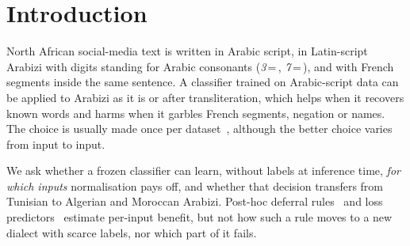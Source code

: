 \section{Introduction}
\label{sec:intro}

North African social-media text is written in Arabic script, in Latin-script Arabizi with digits standing for Arabic consonants (\textit{3}\,=\,, \textit{7}\,=\,), and with French segments inside the same sentence. A classifier trained on Arabic-script data can be applied to Arabizi as it is or after transliteration, which helps when it recovers known words and harms when it garbles French segments, negation or names. The choice is usually made once per dataset~\cite{muller2021unseen,moosa2023transliteration,artetxe2023revisiting}, although the better choice varies from input to input.

We ask whether a frozen classifier can learn, without labels at inference time, \emph{for which inputs} normalisation pays off, and whether that decision transfers from Tunisian to Algerian and Moroccan Arabizi. Post-hoc deferral rules~\cite{jitkrittum2023cascade} and loss predictors~\cite{kim2020learningloss} estimate per-input benefit, but not how such a rule moves to a new dialect with scarce labels, nor which part of it fails.

